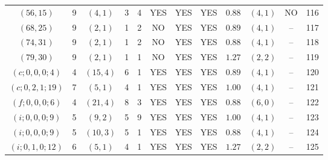 \begin{longtable}{|c|c|c|c|c|c|c|c|c|c|c|c|}
$(56,15)$ & 9 & $(4,1)$ & 3 & 4 & YES & YES & YES & $0.88$ & $(4,1)$ & NO & 116\\
$(68,25)$ & 9 & $(2,1)$ & 1 & 2 & NO & YES & YES & $0.89$ & $(4,1)$ & -- & 117\\
$(74,31)$ & 9 & $(2,1)$ & 1 & 2 & NO & YES & YES & $0.88$ & $(4,1)$ & -- & 118\\
$(79,30)$ & 9 & $(2,1)$ & 1 & 1 & NO & YES & YES & $1.27$ & $(2,2)$ & -- & 119\\
$(c;0,0,0;4)$ & 4 & $(15,4)$ & 6 & 1 & YES & YES & YES & $0.89$ & $(4,1)$ & -- & 120\\
$(c;0,2,1;19)$ & 7 & $(5,1)$ & 4 & 1 & YES & YES & YES & $1.00$ & $(4,1)$ & -- & 121\\
$(f;0,0,0;6)$ & 4 & $(21,4)$ & 8 & 3 & YES & YES & YES & $0.88$ & $(6,0)$ & -- & 122\\
$(i;0,0,0;9)$ & 5 & $(9,2)$ & 5 & 9 & YES & YES & YES & $1.00$ & $(4,1)$ & -- & 123\\
$(i;0,0,0;9)$ & 5 & $(10,3)$ & 5 & 1 & YES & YES & YES & $0.88$ & $(4,1)$ & -- & 124\\
$(i;0,1,0;12)$ & 6 & $(5,1)$ & 4 & 1 & YES & YES & YES & $1.27$ & $(2,2)$ & -- & 125
\end{longtable}
